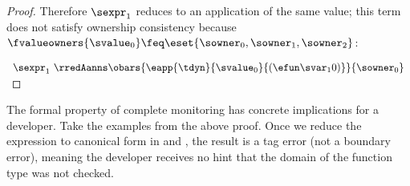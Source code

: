{\begin{proof}
  \noindent
  Therefore $\sexpr_1$ reduces to an application of the same value; this term
   does not satisfy ownership consistency
   because $\fvalueowners{\svalue_0} \feq \eset{\sowner_0,\sowner_1,\sowner_2}$:

  \smallskip
  \(\begin{array}[t]{l@{~}l}
    \sexpr_1
    & \rredAanns \obars{\eapp{\tdyn}{\svalue_0}{(\theargval)}}{\sowner_0}
  \end{array}\) \qedhere
 \end{proof}}

The formal property of complete monitoring has concrete implications for a
developer. Take the examples from the above proof.  Once we reduce the
expression to canonical form in \Tname{} and \Aname{}, the
result is a tag error (not a boundary error), meaning the developer receives no
hint that the domain of the function type was not checked.

